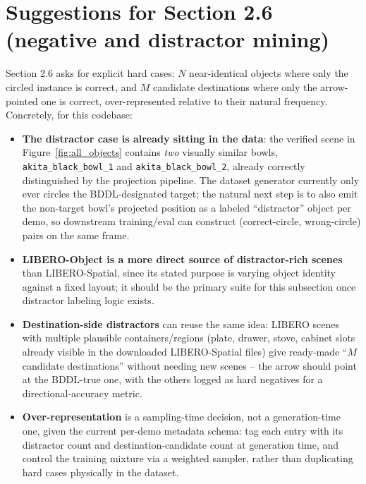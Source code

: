 \documentclass[11pt]{article}
\begin{document}
\section{Suggestions for Section 2.6 (negative and distractor mining)}

Section 2.6 asks for explicit hard cases: $N$ near-identical objects where only the circled instance is correct, and $M$ candidate destinations where only the arrow-pointed one is correct, over-represented relative to their natural frequency. Concretely, for this codebase:

\begin{itemize}[nosep]
  \item \textbf{The distractor case is already sitting in the data}: the verified scene in Figure~\ref{fig:all_objects} contains \emph{two} visually similar bowls, \texttt{akita\_black\_bowl\_1} and \texttt{akita\_black\_bowl\_2}, already correctly distinguished by the projection pipeline. The dataset generator currently only ever circles the BDDL-designated target; the natural next step is to also emit the non-target bowl's projected position as a labeled ``distractor'' object per demo, so downstream training/eval can construct (correct-circle, wrong-circle) pairs on the same frame.
  \item \textbf{LIBERO-Object is a more direct source of distractor-rich scenes} than LIBERO-Spatial, since its stated purpose is varying object identity against a fixed layout; it should be the primary suite for this subsection once distractor labeling logic exists.
  \item \textbf{Destination-side distractors} can reuse the same idea: LIBERO scenes with multiple plausible containers/regions (plate, drawer, stove, cabinet slots already visible in the downloaded LIBERO-Spatial files) give ready-made ``$M$ candidate destinations'' without needing new scenes -- the arrow should point at the BDDL-true one, with the others logged as hard negatives for a directional-accuracy metric.
  \item \textbf{Over-representation} is a sampling-time decision, not a generation-time one, given the current per-demo metadata schema: tag each entry with its distractor count and destination-candidate count at generation time, and control the training mixture via a weighted sampler, rather than duplicating hard cases physically in the dataset.
\end{itemize}
\end{document}
